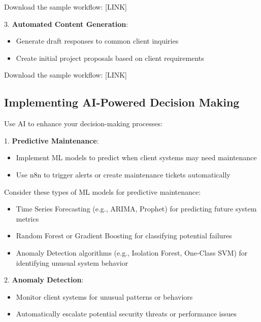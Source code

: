    Download the sample workflow: [LINK]

3. \textbf{Automated Content Generation}:
   \begin{itemize}
     \item Generate draft responses to common client inquiries
     \item Create initial project proposals based on client requirements
   \end{itemize}

   Download the sample workflow: [LINK]



\subsection{Implementing AI-Powered Decision Making}

Use AI to enhance your decision-making processes:

1. \textbf{Predictive Maintenance}:
   \begin{itemize}
     \item Implement ML models to predict when client systems may need maintenance
     \item Use n8n to trigger alerts or create maintenance tickets automatically
   \end{itemize}

   Consider these types of ML models for predictive maintenance:
   \begin{itemize}
     \item Time Series Forecasting (e.g., ARIMA, Prophet) for predicting future system metrics
     \item Random Forest or Gradient Boosting for classifying potential failures
     \item Anomaly Detection algorithms (e.g., Isolation Forest, One-Class SVM) for identifying unusual system behavior
   \end{itemize}

2. \textbf{Anomaly Detection}:
   \begin{itemize}
     \item Monitor client systems for unusual patterns or behaviors
     \item Automatically escalate potential security threats or performance issues
   \end{itemize}

